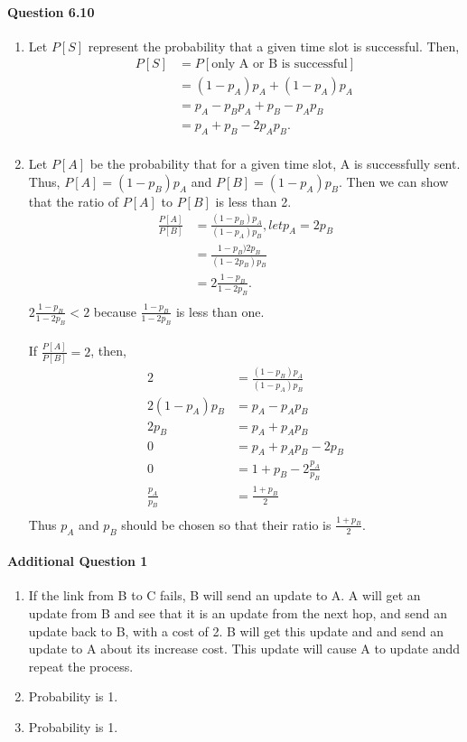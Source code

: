 \documentclass[12pt]{article}
\begin{document}
\paragraph{Question 6.10}
\begin{enumerate}[label={Part \alph*)},leftmargin=*,align=left]
	\item Let $P[ S ]$ represent the probability that a given time slot is successful. Then, 
		\begin{align*}
			P[S] & = P[ \text{only A or B is successful}] \\
			&  =  (1 - p_A)p_A + (1 - p_A)p_A \\
			& = p_A - p_Bp_A + p_B - p_Ap_B \\ 
			& =p_A + p_B - 2p_Ap_B. \\
		\end{align*}
	\item Let $P[A]$ be the probability that for a given time slot, A is successfully sent. Thus, $P[A] = (1 - p_B)p_A$ and $P[B] = (1 - p_A)p_B$. Then we can show that the ratio of $P[A]$ to $P[B]$ is less than 2. 
		\begin{align*}
			\frac{P[A]}{P[B]} & = \frac{(1 - p_B)p_A}{(1-p_A)p_B}, let p_A = 2p_B \\
			& = \frac{1 - p_B)2p_B}{(1-2p_B)p_B}  \\
			& = 2\frac{1 - p_B}{1 - 2p_B}. \\
		\end{align*}
		$2\frac{1 - p_B}{1 - 2p_B}  < 2$ because $\frac{1 - p_B}{1 - 2p_B}$ is less than one.\\ \\
		If $\frac{P[A]}{P[B]} = 2$, then,
		\begin{align*}
			2 & = \frac{ (1 - p_B)p_A}{ (1 - p_A)p_B } \\
			2(1 - p_A)p_B & = p_A - p_Ap_B \\
			2p_B & = p_A + p_Ap_B \\ 
			0 & = p_A + p_Ap_B - 2p_B \\ 
			0 & = 1 + p_B - 2\frac{p_A}{p_B} \\
			\frac{p_A}{p_B} & = \frac{1 + p_B}{2} \\
		\end{align*}
		Thus $p_A$ and $p_B$ should be chosen so that their ratio is $\frac{1 + p_B}{2}$.
\end{enumerate}

\paragraph{Additional Question 1}
\begin{enumerate}[label={Part \alph*)},leftmargin=*,align=left]
	\item If the link from B to C fails, B will send an update to A. A will get an update from B and see that it is an update from the next hop, and send an update back to B, with a cost of 2. B will get this update and and send an update to A about its increase cost. This update will cause A to update andd repeat the process. 
	\item Probability is 1.
	\item Probability is 1.
\end{enumerate}
\end{document}
